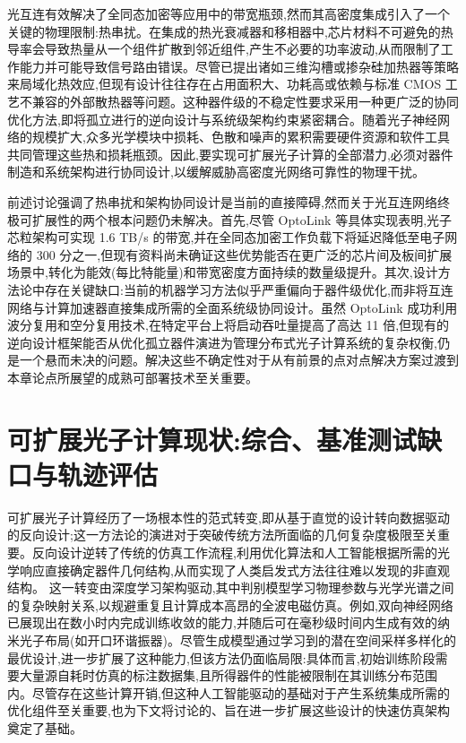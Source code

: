 光互连有效解决了全同态加密等应用中的带宽瓶颈,然而其高密度集成引入了一个关键的物理限制:热串扰。在集成的热光衰减器和移相器中,芯片材料不可避免的热导率会导致热量从一个组件扩散到邻近组件,产生不必要的功率波动,从而限制了工作能力并可能导致信号路由错误。尽管已提出诸如三维沟槽或掺杂硅加热器等策略来局域化热效应,但现有设计往往存在占用面积大、功耗高或依赖与标准 CMOS 工艺不兼容的外部散热器等问题。这种器件级的不稳定性要求采用一种更广泛的协同优化方法,即将孤立进行的逆向设计与系统级架构约束紧密耦合。随着光子神经网络的规模扩大,众多光学模块中损耗、色散和噪声的累积需要硬件资源和软件工具共同管理这些热和损耗瓶颈。因此,要实现可扩展光子计算的全部潜力,必须对器件制造和系统架构进行协同设计,以缓解威胁高密度光网络可靠性的物理干扰。\citep{doi_10_1109_access_2020_3013116_8fec1fb2} \citep{doi_10_1145_3806395_315ab915} \citep{doi_10_3390_nano14080697_c372a140}

前述讨论强调了热串扰和架构协同设计是当前的直接障碍,然而关于光互连网络终极可扩展性的两个根本问题仍未解决。首先,尽管 OptoLink 等具体实现表明,光子芯粒架构可实现 1.6 TB/s 的带宽,并在全同态加密工作负载下将延迟降低至电子网络的 300 分之一,但现有资料尚未确证这些优势能否在更广泛的芯片间及板间扩展场景中,转化为能效(每比特能量)和带宽密度方面持续的数量级提升。其次,设计方法论中存在关键缺口:当前的机器学习方法似乎严重偏向于器件级优化,而非将互连网络与计算加速器直接集成所需的全面系统级协同设计。虽然 OptoLink 成功利用波分复用和空分复用技术,在特定平台上将启动吞吐量提高了高达 11 倍,但现有的逆向设计框架能否从优化孤立器件演进为管理分布式光子计算系统的复杂权衡,仍是一个悬而未决的问题。解决这些不确定性对于从有前景的点对点解决方案过渡到本章论点所展望的成熟可部署技术至关重要。\citep{doi_10_1145_3806395_315ab915}

\section{可扩展光子计算现状:综合、基准测试缺口与轨迹评估}\label{ux53efux6269ux5c55ux5149ux5b50ux8ba1ux7b97ux73b0ux72b6ux7efcux5408ux57faux51c6ux6d4bux8bd5ux7f3aux53e3ux4e0eux8f68ux8ff9ux8bc4ux4f30}

可扩展光子计算经历了一场根本性的范式转变,即从基于直觉的设计转向数据驱动的反向设计;这一方法论的演进对于突破传统方法所面临的几何复杂度极限至关重要。反向设计逆转了传统的仿真工作流程,利用优化算法和人工智能根据所需的光学响应直接确定器件几何结构,从而实现了人类启发式方法往往难以发现的非直观结构。\citep{doi_10_1117_12_3066105_d6297c38} \citep{doi_10_48550_arxiv_2506_18627_e2696034} 这一转变由深度学习架构驱动,其中判别模型学习物理参数与光学光谱之间的复杂映射关系,以规避重复且计算成本高昂的全波电磁仿真。例如,双向神经网络已展现出在数小时内完成训练收敛的能力,并随后可在毫秒级时间内生成有效的纳米光子布局(如开口环谐振器)。尽管生成模型通过学习到的潜在空间采样多样化的最优设计,进一步扩展了这种能力,但该方法仍面临局限:具体而言,初始训练阶段需要大量源自耗时仿真的标注数据集,且所得器件的性能被限制在其训练分布范围内。尽管存在这些计算开销,但这种人工智能驱动的基础对于产生系统集成所需的优化组件至关重要,也为下文将讨论的、旨在进一步扩展这些设计的快速仿真架构奠定了基础。\citep{doi_10_1515_nanoph_2021_0660_2d91a441} \citep{doi_10_1515_nanoph_2024_0536_4b6631ba}

